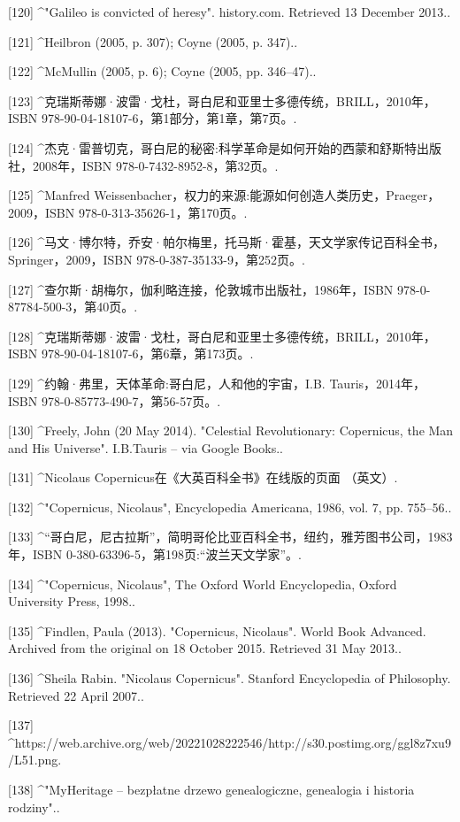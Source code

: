 [120]
^"Galileo is convicted of heresy". history.com. Retrieved 13 December 2013..

[121]
^Heilbron (2005, p. 307); Coyne (2005, p. 347)..

[122]
^McMullin (2005, p. 6); Coyne (2005, pp. 346–47)..

[123]
^克瑞斯蒂娜·波雷·戈杜，哥白尼和亚里士多德传统，BRILL，2010年，ISBN 978-90-04-18107-6，第1部分，第1章，第7页。.

[124]
^杰克·雷普切克，哥白尼的秘密:科学革命是如何开始的西蒙和舒斯特出版社，2008年，ISBN 978-0-7432-8952-8，第32页。.

[125]
^Manfred Weissenbacher，权力的来源:能源如何创造人类历史，Praeger，2009，ISBN 978-0-313-35626-1，第170页。.

[126]
^马文·博尔特，乔安·帕尔梅里，托马斯·霍基，天文学家传记百科全书，Springer，2009，ISBN 978-0-387-35133-9，第252页。.

[127]
^查尔斯·胡梅尔，伽利略连接，伦敦城市出版社，1986年，ISBN 978-0-87784-500-3，第40页。.

[128]
^克瑞斯蒂娜·波雷·戈杜，哥白尼和亚里士多德传统，BRILL，2010年，ISBN 978-90-04-18107-6，第6章，第173页。.

[129]
^约翰·弗里，天体革命:哥白尼，人和他的宇宙，I.B. Tauris，2014年，ISBN 978-0-85773-490-7，第56-57页。.

[130]
^Freely, John (20 May 2014). "Celestial Revolutionary: Copernicus, the Man and His Universe". I.B.Tauris – via Google Books..

[131]
^Nicolaus Copernicus在《大英百科全书》在线版的页面 （英文）.

[132]
^"Copernicus, Nicolaus", Encyclopedia Americana, 1986, vol. 7, pp. 755–56..

[133]
^“哥白尼，尼古拉斯”，简明哥伦比亚百科全书，纽约，雅芳图书公司，1983年，ISBN 0-380-63396-5，第198页:“波兰天文学家”。.

[134]
^"Copernicus, Nicolaus", The Oxford World Encyclopedia, Oxford University Press, 1998..

[135]
^Findlen, Paula (2013). "Copernicus, Nicolaus". World Book Advanced. Archived from the original on 18 October 2015. Retrieved 31 May 2013..

[136]
^Sheila Rabin. "Nicolaus Copernicus". Stanford Encyclopedia of Philosophy. Retrieved 22 April 2007..

[137]
^https://web.archive.org/web/20221028222546/http://s30.postimg.org/ggl8z7xu9/L51.png.

[138]
^"MyHeritage – bezpłatne drzewo genealogiczne, genealogia i historia rodziny"..

